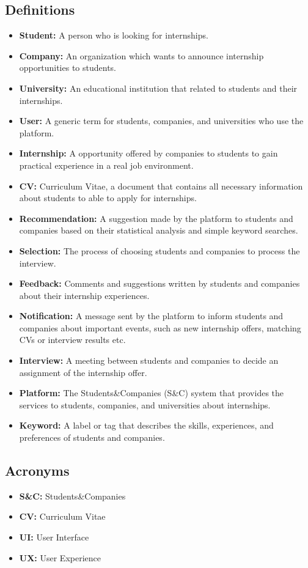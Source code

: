 \subsection{Definitions}\label{subsec:definitions}
\begin{itemize}
    \item \textbf{Student:} A person who is looking for internships.
    \item \textbf{Company:} An organization which wants to announce internship opportunities to students.
    \item \textbf{University:} An educational institution that related to students and their internships.
    \item \textbf{User:} A generic term for students, companies, and universities who use the platform.
    \item \textbf{Internship:} A opportunity offered by companies to students to gain practical experience in a real job environment.
    \item \textbf{CV:} Curriculum Vitae, a document that contains all necessary information about students to able to apply for internships.
    \item \textbf{Recommendation:} A suggestion made by the platform to students and companies based on their statistical analysis and simple 
    keyword searches.
    \item \textbf{Selection:} The process of choosing students and companies to process the interview.
    \item \textbf{Feedback:} Comments and suggestions written by students and companies about their internship experiences.
    \item \textbf{Notification:} A message sent by the platform to inform students and companies about important events, such as new internship 
    offers, matching CVs or interview results etc.
    \item \textbf{Interview:} A meeting between students and companies to decide an assignment of the internship offer.
    \item \textbf{Platform:} The Students\&Companies (S\&C) system that provides the services to students, companies, and universities about
    internships.
    \item \textbf{Keyword:} A label or tag that describes the skills, experiences, and preferences of students and companies.

\end{itemize}

\subsection{Acronyms}\label{subsec:acronyms}
\begin{itemize}
    \item \textbf{S\&C:} Students\&Companies
    \item \textbf{CV:} Curriculum Vitae
    \item \textbf{UI:} User Interface
    \item \textbf{UX:} User Experience
\end{itemize}

